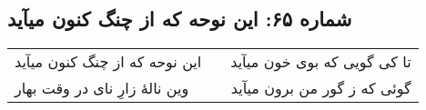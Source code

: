 \begin{center}
\section*{شماره ۶۵: این نوحه که از چنگ کنون میآید}
\label{sec:065}
\begin{longtable}{l p{0.5cm} r}
این نوحه که از چنگ کنون میآید
&&
تا کی گویی که بوی خون میآید
\\
وین نالهٔ زارِ نای در وقت بهار
&&
گوئی که ز گور من برون میآید
\\
\end{longtable}
\end{center}
